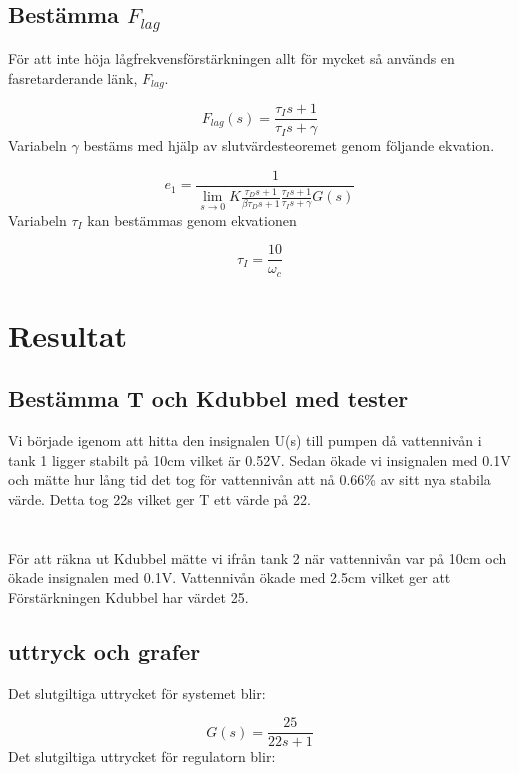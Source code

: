 \documentclass[a4paper]{article}
\begin{document}
\subsection{Bestämma $F_{lag}$}

För att inte höja lågfrekvensförstärkningen allt för mycket så används en fasretarderande länk, $F_{lag}$.

\begin{equation}
  F_{lag}(s)=\frac{\tau_Is+1}{\tau_Is+\gamma}
\end{equation}
Variabeln $\gamma$ bestäms med hjälp av slutvärdesteoremet genom följande ekvation.

\begin{equation}
  e_1=\frac{1}{\lim_{s \to 0}K\frac{\tau_Ds+1}{\beta\tau_Ds+1}\frac{\tau_Is+1}{\tau_Is+\gamma}G(s)}
\end{equation}
Variabeln $\tau_I$ kan bestämmas genom ekvationen

\begin{equation}
  \tau_I=\frac{10}{\omega_c}
\end{equation}

\section{Resultat}

\subsection{Bestämma T och Kdubbel med tester}
Vi började igenom att hitta den insignalen U(s) till pumpen då vattennivån i tank 1 ligger stabilt på 10cm vilket är 0.52V. Sedan ökade vi insignalen med 0.1V och mätte hur lång tid det tog för vattennivån att nå 0.66\% av sitt nya stabila värde. Detta tog 22s vilket ger T ett värde på 22. \\
\\\\
För att räkna ut Kdubbel mätte vi ifrån tank 2 när vattennivån var på 10cm och ökade insignalen med 0.1V. Vattennivån ökade med 2.5cm vilket ger att Förstärkningen Kdubbel har värdet 25.

\subsection{uttryck och grafer}
Det slutgiltiga uttrycket för systemet blir:

\begin{equation*}
  G(s)=\frac{25}{22s+1}
\end{equation*}
Det slutgiltiga uttrycket för regulatorn blir:
\end{document}
